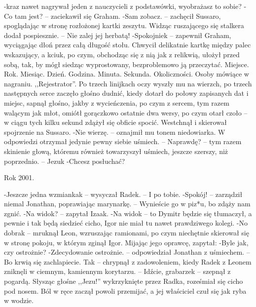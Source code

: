 \documentclass[../MAIN.tex]{subfiles}
\begin{document}
-\3kraz nawet nagrywał jeden z nauczycieli z podstawówki, wyobrażasz to sobie?
-Co tam jest? -- zaciekawił się Graham.
-Sam zobacz. -- zachęcił Sussaro, spoglądając w stronę rozłożonej kartki zeszytu. Widząc ruszającego się stalkera dodał pospiesznie. -- Nie zalej jej herbatą!
-Spokojnie\3k -- zapewnił Graham, wyciągając dłoń przez całą długość stołu. Chwycił delikatnie kartkę między palec wskazujący, a kciuk, po czym, obchodząc się z nią jak z relikwią, ułożył przed sobą, tak, by mógł siedząc wyprostowany, bezproblemowo ją przeczytać.
Miejsce.
Rok.
Miesiąc.
Dzień.
Godzina.
Minuta.
Sekunda.
Okoliczności.
Osoby mówiące w nagraniu.
,,Rejestrator''.
Po trzech linijkach oczy wyszły mu na wierzch, po trzech następnych serce zaczęło głośno dudnić, kiedy dotarł do połowy zapisanych dat i miejsc, sapnął głośno, jakby z wycieńczenia, po czym z sercem, tym razem walącym jak młot, omiótł gorączkowo ostatnie dwa wersy, po czym otarł czoło -- w ciągu tych kilku sekund zdążył się obficie spocić. Westchnął i skierował spojrzenie na Sussaro.
-Nie wierzę. -- oznajmił mu tonem niedowiarka. W odpowiedzi otrzymał jedynie pewny siebie uśmiech. -- Naprawdę? -- tym razem skinienie głową, któremu również towarzyszył uśmiech, jeszcze szerszy, niż poprzednio. -- Jezu\3k
-Chcesz posłuchać?



Rok 2001.


-Jeszcze jedna wzmianka\3k -- wysyczał Radek. -- I po tobie.
-Spokój! -- zarządził niemal Jonathan, poprawiając marynarkę. -- Wynieście go w piz*u, bo zdąży nam zgnić.
-Na widok? -- zapytał Izaak.
-Na widok -- to Dymitr będzie się tłumaczył, a pewnie i tak będą siedzieć cicho, Igor nie miał tu nawet prawdziwego kolegi.
-No dobra\3k -- mruknął Leon, wzruszając ramionami, po czym niechętnie skierował się w stronę pokoju, w którym zginął Igor. Mijając jego oprawcę, zapytał:
-Byle jak, czy ostrożnie?
-Zdecydowanie ostrożnie. -- odpowiedział Jonathan z uśmiechem. -- Bo krwią się zachlapiecie. Ta\3k -- chrypnął z zadowoleniem, kiedy Radek z Leonem zniknęli w ciemnym, kamiennym korytarzu. -- Idźcie, grabarze\3k -- szepnął z pogardą.
Słysząc głośne ,,Jezu!'' wykrzyknięte przez Radka, roześmiał się cicho pod nosem. Ból w ręce zaczął powoli przemijać, a jej właściciel czuł się jak ryba w wodzie.
\end{document}
